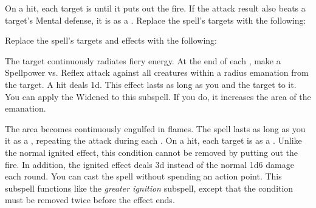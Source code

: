 On a hit, each target is  until it puts out the fire.
If the attack result also beats a target's Mental defense, it is  as a .
Replace the spell's targets with the following:
\begin{spellcontent}
\begin{augmenttargetinginfo}
\end{augmenttargetinginfo}
\end{spellcontent}
Replace the spell's targets and effects with the following:
\begin{spellcontent}
\begin{augmenttargetinginfo}
\end{augmenttargetinginfo}
\begin{augmenteffects}
\spelleffect
The target continuously radiates fiery energy.
At the end of each , make a Spellpower vs. Reflex attack against all creatures within a \areamed radius emanation from the target.
A hit deals  \minus1d.
This effect lasts as long as you and the target  to it.
You can apply the Widened  to this subspell.
If you do, it increases the area of the emanation.
\end{augmenteffects}
\end{spellcontent}
The area becomes continuously engulfed in flames.
The spell lasts as long as you  it as a , repeating the attack during each .
On a hit, each target is  as a .
Unlike the normal ignited effect, this condition cannot be removed by putting out the fire.
In addition, the ignited effect deals  \minus3d instead of the normal 1d6 damage each round.
You can cast the spell without spending an action point.
This subspell functions like the \textit{greater ignition} subspell, except that the condition must be removed twice before the effect ends.
